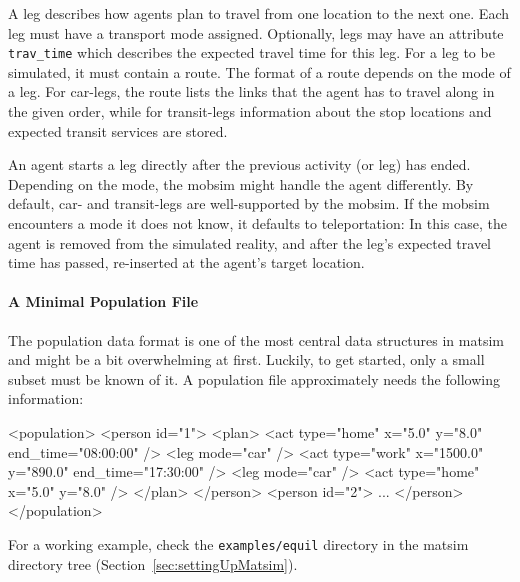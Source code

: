 A \gls{leg} describes how agents plan to travel from one location to the next one. Each \gls{leg} must have a transport mode assigned. Optionally, legs may have an attribute \lstinline|trav_time| which describes the expected travel time for this leg. For a leg to be simulated, it must contain a route. The format of a route depends on the mode of a leg. For car-legs, the route lists the links that the agent has to travel along in the given order, while for transit-legs information about the stop locations and expected transit services are stored.

An agent starts a leg directly after the previous activity (or leg) has ended. Depending on the mode, the \gls{mobsim} might handle the agent differently. By default, car- and transit-legs are well-supported by the \gls{mobsim}. If the \gls{mobsim} encounters a mode it does not know, it defaults to \gls{teleportation}: In this case, the agent is removed from the simulated reality, and after the leg's expected travel time has passed, re-inserted at the agent's target location.

\paragraph{A Minimal Population File}

The population data format is one of the most central data structures in \gls{matsim} and might be a bit overwhelming at first. Luckily, to get started, only a small subset must be known of it.  A population file approximately needs the following information:
\begin{xml}
<population> 
   <person id="1"> 
      <plan> 
         <act type="home" x="5.0" y="8.0" end_time="08:00:00" /> 
         <leg mode="car" /> 
         <act type="work" x="1500.0" y="890.0" end_time="17:30:00" /> 
         <leg mode="car" /> 
         <act type="home" x="5.0" y="8.0" /> 
      </plan> 
   </person> 
   <person id="2"> 
      ... 
   </person> 
</population>
\end{xml}
For a working example, check the \lstinline{examples/equil} directory in the \gls{matsim} directory tree (\cf Section~\ref{sec:settingUpMatsim}).

